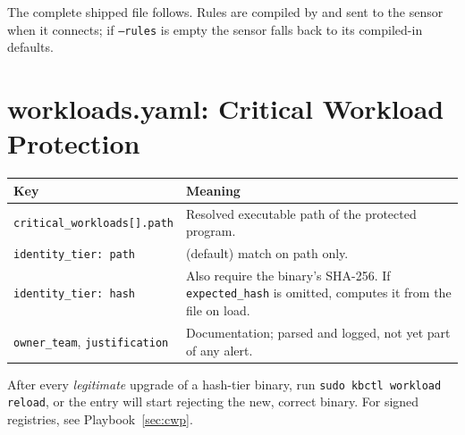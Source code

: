 The complete shipped file follows. Rules are compiled by  and sent to the sensor when it connects;
if \texttt{--rules} is empty the sensor falls back to its compiled-in defaults.

\section{workloads.yaml: Critical Workload Protection}
\begin{center}\small
\begin{tabularx}{\textwidth}{@{}L{4cm}Y@{}}
\toprule
\textbf{Key} & \textbf{Meaning}\\
\midrule
\texttt{critical\_workloads[].path} & Resolved executable path of the protected program.\\
\texttt{identity\_tier: path} & (default) match on path only.\\
\texttt{identity\_tier: hash} & Also require the binary's SHA-256. If \texttt{expected\_hash} is omitted,  computes it from the file on load.\\
\texttt{owner\_team}, \texttt{justification} & Documentation; parsed and logged, not yet part of any alert.\\
\bottomrule
\end{tabularx}
\end{center}
\begin{kbwarn}
After every \emph{legitimate} upgrade of a hash-tier binary, run \texttt{sudo kbctl workload reload}, or the entry
will start rejecting the new, correct binary. For signed registries, see Playbook~\ref{sec:cwp}.
\end{kbwarn}

